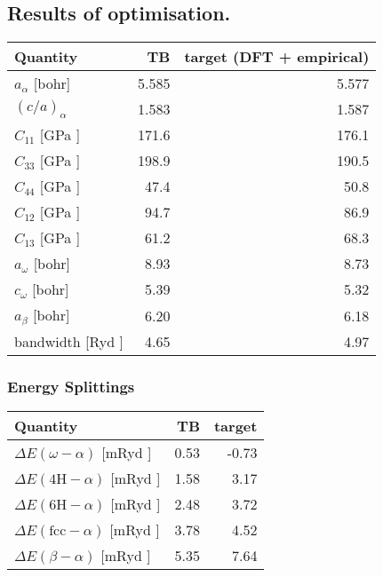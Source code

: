 \documentclass[11pt]{article}
\begin{document}
\subsection*{Results of optimisation.}
\label{sec:orgbed67c2}
\begin{center}
\begin{tabular}{lrr}
\hline
Quantity & TB & target (DFT + empirical)\\
\hline
\(a_{\alpha}\)              [bohr] & 5.585 & 5.577\\
\((c/a)_{\alpha}\) & 1.583 & 1.587\\
\(C_{11}\)                  [GPa ] & 171.6 & 176.1\\
\(C_{33}\)                  [GPa ] & 198.9 & 190.5\\
\(C_{44}\)                  [GPa ] & 47.4 & 50.8\\
\(C_{12}\)                  [GPa ] & 94.7 & 86.9\\
\(C_{13}\)                  [GPa ] & 61.2 & 68.3\\
\(a_{\omega}\)              [bohr] & 8.93 & 8.73\\
\(c_{\omega}\)              [bohr] & 5.39 & 5.32\\
\(a_{\beta}\)               [bohr] & 6.20 & 6.18\\
bandwidth                 [Ryd ] & 4.65 & 4.97\\
\hline
\end{tabular}
\end{center}

\subsubsection*{Energy Splittings}
\label{sec:orgf21683c}

\begin{center}
\begin{tabular}{lrr}
\hline
Quantity & TB & target\\
\hline
\(\Delta E(\omega-\alpha)\)     [mRyd ] & 0.53 & -0.73\\
\(\Delta E(\text{4H}-\alpha)\)  [mRyd ] & 1.58 & 3.17\\
\(\Delta E(\text{6H}-\alpha)\)  [mRyd ] & 2.48 & 3.72\\
\(\Delta E(\text{fcc}-\alpha)\) [mRyd ] & 3.78 & 4.52\\
\(\Delta E(\beta-\alpha)\)      [mRyd ] & 5.35 & 7.64\\
\hline
\end{tabular}
\end{center}
\end{document}
